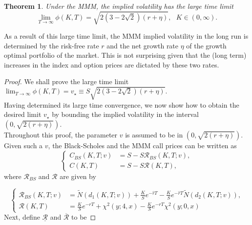 \documentclass[a4 paper, 12pt]{report}
\theoremstyle{plain}
\newtheorem{theorem}{\textbf{Theorem}}[section]
\begin{document}
\begin{theorem}\cite[pg.~11]{guo2011small}
Under the MMM, the implied volatility has the large time limit
\begin{equation}\label{12}
\lim_{T\rightarrow \infty}\phi(K,T) = \sqrt{2(3-2\sqrt{2})(r+\eta)},~~~K\in (0,\infty).
\end{equation}
\end{theorem}
As a result of this large time limit, the MMM implied volatility in the long run is
determined by the risk-free rate $r$ and the net growth rate $\eta$ of the growth optimal portfolio
of the market. This is not surprising given that the (long term) increases in the index and
option prices are dictated by these two rates.
\begin{proof}
We shall prove the large time limit\\
$\lim_{T\rightarrow \infty}\phi(K,T) = v_\star\equiv S\sqrt{2(3-2\sqrt{2})(r+\eta)}$.\\
Having determined its large time convergence, we now show how to obtain the desired
limit $v_\star$ by bounding the implied volatility in the interval $(0,\sqrt{2(r+\eta)})$.\\
Throughout this proof, the parameter $v$ is assumed to be in $(0,\sqrt{2(r+\eta)})$. Given such a $v$, the Black-Scholes and the MMM call prices can be written as
\begin{equation}\label{37}
\left\{
\begin{split}
C_{BS}(K,T;v)& = S-S\mathcal{R}_{BS}(K,T;v),\\
C(K,T)& = S-S\mathcal{R}(K,T),
\end{split}
\right.
\end{equation}
where $\mathcal{R}_{BS}$ and $\mathcal{R}$ are given by

\begin{equation*}%
\left\{
\begin{split}
\mathcal{R}_{BS}(K,T;v)& = \tilde{N}(d_1(K,T;v))+\frac{K}{S}e^{-\hat{r}T} - \frac{K}{S}e^{-\hat{r}T}\tilde{N}(d_2(K,T;v)),\\
\mathcal{R}(K,T)& = \frac{K}{S}e^{-rT}+\chi^2(y;4,x) - \frac{K}{S}e^{-rT}\chi^2(y;0,x) 
\end{split}
\right.
\end{equation*}
Next, define $\underline{\mathcal{R}}$ and $\overline{\mathcal{R}}$ to be 


\end{proof}
\end{document}
